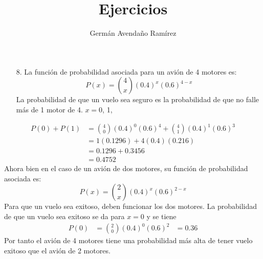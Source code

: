 \documentclass[10pt,letterpaper]{article}
\author{Germán Avendaño Ramírez}
\title{Ejercicios}
\begin{document}
\maketitle
\begin{itemize}
\item[8.] La función de probabilidad asociada para un avi\'{o}n de 4 motores es:
\[P(x)=\displaystyle{4 \choose x}(0.4)^{x}(0.6)^{4-x}\]
La probabilidad de que un vuelo sea seguro es la probabilidad de que no falle más de 1 motor de 4.
$x=0$, 1, 
\end{itemize}
\begin{align*}
P(0)+P(1)&=\displaystyle{4 \choose 0}(0.4)^{0}(0.6)^{4}+\displaystyle{4 \choose 1}(0.4)^{1}(0.6)^{3}\\
&=1(0.1296)+4(0.4)(0.216)\\
&=0.1296+0.3456\\
&=0.4752
\end{align*}
Ahora bien en el caso de un avión de dos motores, su función de probabilidad asociada es:
\[P(x)=\displaystyle{2\choose x}(0.4)^{x}(0.6)^{2-x}\]
Para que un vuelo sea exitoso, deben funcionar los dos motores. La probabilidad de que un vuelo sea exitoso se da para $x=0$ y se tiene
\begin{align*}
P(0)&=\displaystyle{2\choose 0}(0.4)^{0}(0.6)^{2}
&=0.36
\end{align*}
Por tanto el avión de 4 motores tiene una probabilidad más alta de tener vuelo exitoso que el avión de 2 motores.
\end{document}
